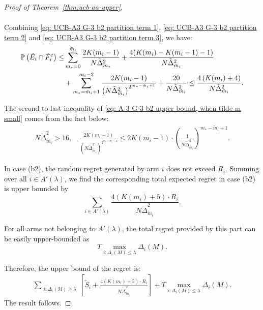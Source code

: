 \documentclass[
  12pt]{article}
\begin{document}
\begin{proof}[Proof of Theorem~\ref{thm:ucb-aa-upper}]
\begin{itemize}
\begin{align}
\end{align}
Combining \eqref{eq: UCB-A3 G-3 b2 partition term 1}, \eqref{eq: UCB-A3 G-3 b2 partition term 2} and \eqref{eq: UCB-A3 G-3 b2 partition term 3}, we have:
\begin{align}
   \mathbb{P}\left(\tilde{E}_i\cap\tilde{F}_i^c\right)\leq &\sum_{m_*=0}^{\tilde{m}_i} \frac{2K(m_i-1)}{N\tilde{\Delta}_{m_*}^2}+\frac{4(K(m_i)-K(m_i-1)-1)}{N\tilde{\Delta}_{\tilde{m}_i}^2}\notag \\
   &+\sum_{m_*=\tilde{m}_i+1}^{m_i-2}\frac{2K(m_i-1)}{\left(N\tilde{\Delta}_{\tilde{m}_i}^2\right)^{2^{m_*-\tilde{m}_i+1}}}+\frac{20}{N\tilde{\Delta}_{\tilde{m}_i}^2} \leq \frac{4\left(K(m_i)+4\right)}{N\tilde{\Delta}_{\tilde{m}_i}^2}.
   \label{eq: A-3 G-3 b2 upper bound, when tilde m small}
\end{align}


\end{itemize}
The second-to-last inequality of \eqref{eq: A-3 G-3 b2 upper bound, when tilde m small} comes from the fact below:
\begin{align*}
 N\tilde{\Delta}_{\tilde{m}_i}^2>16,\quad   \frac{2K(m_i-1)}{\left(N\tilde{\Delta}_{\tilde{m}_i}^2\right)^{2^{m_*-\tilde{m}_i+1}}}\leq 2K(m_i-1)\cdot \left(\frac{1}{N\tilde{\Delta}_{\tilde{m}_i}^2} \right)^{m_*-\tilde{m}_i+1}.
\end{align*}

In case (b2), the random regret generated by arm \( i \) does not exceed $R_i$. Summing over all $i\in A'(\lambda)$, we find the corresponding total expected regret in case (b2) is upper bounded by
\[\sum_{i \in A'(\lambda)} \frac{4\left(K(m_i)+5\right)\cdot R_i}{N\tilde{\Delta}_{\tilde{m}_i}^2}.\]

For all arms not belonging to \( A'(\lambda) \), the total regret provided by this part can be easily upper-bounded as 
\[ T\max_{i:\Delta_i(M)\leq \lambda}  \Delta_i(M). \] 

Therefore, the upper bound of the regret is: 
\begin{align*}
    \sum_{\substack{i: \Delta_i(M) \geq \lambda}} \left[ \tilde{S}_i+\frac{4\left(K(m_i)+5\right)\cdot R_i}{N\tilde{\Delta}_{\tilde{m}_i}^2}\right] +T\max_{i:\Delta_i(M)\leq \lambda}  \Delta_i(M).
\end{align*}
The result follows. %
\end{proof}
\end{document}
